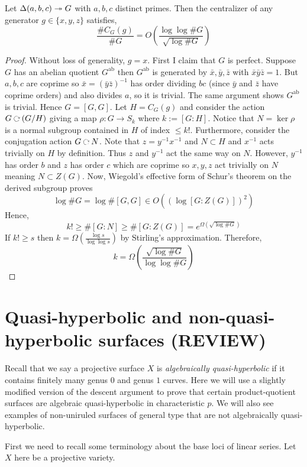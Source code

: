 \documentclass[main.tex]{subfiles}
\begin{document}
\begin{lemma}
Let $\Delta(a,b,c) \twoheadrightarrow G$ with $a,b,c$ distinct primes. Then the centralizer of any generator $g \in \{x,y,z\}$ satisfies,
\[ \frac{\# C_G(g)}{\#G} = O \left( \frac{\log\log{\#G}}{\sqrt{\log{\# G}}} \right) \]
\end{lemma}

\begin{proof}
Without loss of generality, $g = x$. First I claim that $G$ is perfect. Suppose $G$ has an abelian quotient $G^{\mathrm{ab}}$ then $G^{\mathrm{ab}}$ is generated by $\bar{x},\bar{y},\bar{z}$ with $\bar{x}\bar{y}\bar{z} = 1$. But $a,b,c$ are coprime so $\bar{x} = (\bar{y}\bar{z})^{-1}$ has order dividing $bc$ (since $\bar{y}$ and $\bar{z}$ have coprime orders) and also divides $a$, so it is trivial. The same argument shows $G^{\mathrm{ab}}$ is trivial. Hence $G = [G, G]$. 
Let $H = C_G(g)$ and consider the action $G \acts (G / H)$ giving a map $\rho : G \to S_k$ where $k := [G : H]$. Notice that $N = \ker{\rho}$ is a normal subgroup contained in $H$ of index $\le k!$. Furthermore, consider the conjugation action $G \acts N$. Note that $z = y^{-1} x^{-1}$ and $N \subset H$ and $x^{-1}$ acts trivially on $H$ by definition. Thus $z$ and $y^{-1}$ act the same way on $N$. However, $y^{-1}$ has order $b$ and $z$ has order $c$ which are coprime so $x,y,z$ act trivially on $N$ meaning $N \subset Z(G)$. Now, Wiegold's effective form of Schur's theorem on the derived subgroup \cite[(3.1)]{wiegold:multiplicators} proves 
\[ \log{\# G} = \log{\# [G, G]} \in O((\log{[G : Z(G)]})^2) \]
Hence,
\[ k! \ge \# [G : N] \ge \# [G : Z(G)] = e^{\Omega(\sqrt{\log{\#G}})} \]
If $k! \ge s$ then $k = \Omega(\frac{\log{s}}{\log\log{s}})$ by Stirling's approximation. Therefore,
\[ k = \Omega \left( \frac{\sqrt{\log{\#G}}}{\log{\log{\#G}}} \right) \]
\end{proof}

\section{Quasi-hyperbolic and non-quasi-hyperbolic surfaces (REVIEW)} \label{sec:quasi-hyperbolicity}

Recall that we say a projective surface $X$ is \textit{algebraically quasi-hyperbolic} if it contains finitely many genus $0$ and genus $1$ curves. Here we will use a slightly modified version of the descent argument to prove that certain product-quotient surfaces are algebraic quasi-hyperbolic in characteristic $p$. We will also see examples of non-uniruled surfaces of general type that are not algebraically quasi-hyperbolic. 
\par 
First we need to recall some terminology about the base loci of linear series. Let $X$ here be a projective variety.
\end{document}

